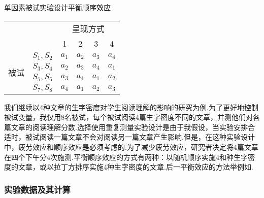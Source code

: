 \begin{margintable}
  \centering
  \caption{单因素被试实验设计平衡顺序效应}
    \begin{tabular}{c|c|llll}
    \toprule
        \multicolumn{1}{r}{} &       & \multicolumn{4}{c}{呈现方式} \\
        \cmidrule{3-6}    \multicolumn{1}{r}{} &       & \multicolumn{1}{c}{1} & \multicolumn{1}{c}{2} & \multicolumn{1}{c}{3} & \multicolumn{1}{c}{4} \\
    \midrule
        \multirow{4}[0]{*}{被试} & $S_1, S_2$ & $a_1$ & $a_2$ & $a_3$ & $a_4$ \\
              & $S_3, S_4$ & $a_2$ & $a_3$ & $a_4$ & $a_1$ \\
              & $S_5, S_6$ & $a_3$ & $a_4$ & $a_1$ & $a_2$ \\
              & $S_7, S_8$ & $a_4$ & $a_1$ & $a_2$ & $a_3$ \\
        \bottomrule
    \end{tabular}
\end{margintable}

 我们继续以4种文章的生字密度对学生阅读理解的影响的研究为例.为了更好地控制被试变量，我仅用8名被试，每个被试阅读4篇生字密度不同的文章，并测他们对各篇文章的阅读理解分数.选择使用重复测量实验设计是由于我假设，当实验安排合适时，被试阅读一篇文章不会对阅读另一篇文章产生影响.但是，在这种实验设计中，疲劳效应和顺序效应是必须考虑的.为了减少疲劳效应，研究者决定将4篇文章在四个下午分4次施测.平衡顺序效应的方式有两种：以随机顺序实施4和种生字密度的文章，或以拉丁方排序实施4种生字密度的文章.后一平衡效应的方法举例如.
  
\subsubsection{实验数据及其计算}

